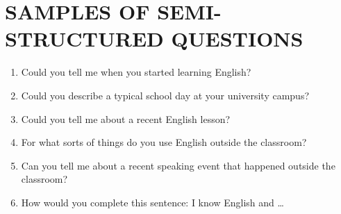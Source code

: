 \chapter{SAMPLES OF SEMI-STRUCTURED QUESTIONS}

\begin{enumerate}
    \item Could you tell me when you started learning English?
    \item Could you describe a typical school day at your university campus?
    \item Could you tell me about a recent English lesson?
    \item For what sorts of things do you use English outside the classroom?
    \item Can you tell me about a recent speaking event that happened outside the
classroom?
    \item How would you complete this sentence: I know English and …
\end{enumerate}